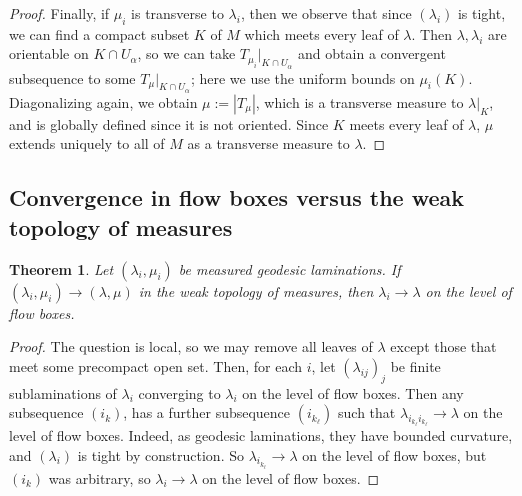 \documentclass[reqno,11pt]{amsart}
\DeclareMathOperator{\supp}{supp}
\newcommand{\normal}{\mathbf n}
\newtheorem{theorem}{Theorem}[section]
\newtheorem{lemma}[theorem]{Lemma}
\theoremstyle{definition}
\numberwithin{equation}{section}
\begin{document}
\begin{proof}
Finally, if $\mu_i$ is transverse to $\lambda_i$, then we observe that since $(\lambda_i)$ is tight, we can find a compact subset $K$ of $M$ which meets every leaf of $\lambda$.
Then $\lambda, \lambda_i$ are orientable on $K \cap U_\alpha$, so we can take $T_{\mu_i}|_{K \cap U_\alpha}$ and obtain a convergent subsequence to some $T_\mu|_{K \cap U_\alpha}$; here we use the uniform bounds on $\mu_i(K)$.
Diagonalizing again, we obtain $\mu := |T_\mu|$, which is a transverse measure to $\lambda|_K$, and is globally defined since it is not oriented.
Since $K$ meets every leaf of $\lambda$, $\mu$ extends uniquely to all of $M$ as a transverse measure to $\lambda$.
\end{proof}

\subsection{Convergence in flow boxes versus the weak topology of measures}
\begin{theorem}
Let $(\lambda_i, \mu_i)$ be measured geodesic laminations.
If $(\lambda_i, \mu_i) \to (\lambda, \mu)$ in the weak topology of measures, then $\lambda_i \to \lambda$ on the level of flow boxes.
\end{theorem}
\begin{proof}
The question is local, so we may remove all leaves of $\lambda$ except those that meet some precompact open set.
Then, for each $i$, let $(\lambda_{ij})_j$ be finite sublaminations of $\lambda_i$ converging to $\lambda_i$ on the level of flow boxes.
Then any subsequence $(i_k)$, has a further subsequence $(i_{k_\ell})$ such that $\lambda_{i_{k_\ell} i_{k_\ell}} \to \lambda$ on the level of flow boxes.
Indeed, as geodesic laminations, they have bounded curvature, and $(\lambda_i)$ is tight by construction.
So $\lambda_{i_{k_\ell}} \to \lambda$ on the level of flow boxes, but $(i_k)$ was arbitrary, so $\lambda_i \to \lambda$ on the level of flow boxes.
\end{proof}

\end{document}
